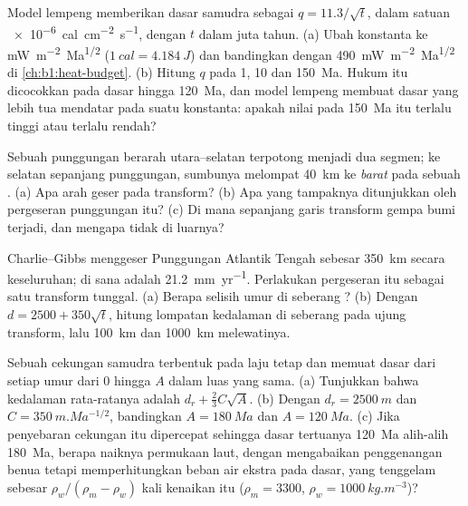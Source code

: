 \begin{exercise}[$\star\star$]\label{exo:b1:rifts-ridges-margins:7}
Model lempeng memberikan  dasar samudra sebagai $q = 11.3/\sqrt t$, dalam satuan \qty{e-6}{cal.cm^{-2}.s^{-1}}, dengan $t$ dalam juta tahun. (a) Ubah konstanta ke \unit{mW.m^{-2}.Ma^{1/2}} ($\qty{1}{cal} =
\qty{4.184}{J}$) dan bandingkan dengan \qty{490}{mW.m^{-2}.Ma^{1/2}} di \cref{ch:b1:heat-budget}. (b) Hitung $q$ pada 1, 10 dan \qty{150}{Ma}. Hukum itu dicocokkan pada dasar hingga \qty{120}{Ma}, dan model lempeng membuat  dasar yang lebih tua mendatar pada suatu konstanta: apakah nilai pada \qty{150}{Ma} itu terlalu tinggi atau terlalu rendah?
\end{exercise}

\begin{exercise}[$\star\star$]\label{exo:b1:rifts-ridges-margins:8}
Sebuah punggungan berarah utara--selatan terpotong menjadi dua segmen; ke selatan sepanjang punggungan, sumbunya melompat \qty{40}{km} ke \emph{barat} pada sebuah . (a) Apa arah geser pada transform? (b) Apa yang tampaknya ditunjukkan oleh pergeseran punggungan itu? (c) Di mana sepanjang garis transform gempa bumi terjadi, dan mengapa tidak di luarnya?
\end{exercise}

\begin{exercise}[$\star\star$]\label{exo:b1:rifts-ridges-margins:9}
 Charlie--Gibbs menggeser Punggungan Atlantik Tengah sebesar \qty{350}{km} secara keseluruhan;  di sana adalah \qty{21.2}{mm.yr^{-1}}. Perlakukan pergeseran itu sebagai satu transform tunggal. (a) Berapa selisih umur di seberang ? (b) Dengan $d = 2500 + 350\sqrt t$, hitung lompatan kedalaman di seberang  pada ujung transform, lalu \qty{100}{km} dan \qty{1000}{km} melewatinya.
\end{exercise}

\begin{exercise}[$\star\star\star$]\label{exo:b1:rifts-ridges-margins:10}
Sebuah cekungan samudra terbentuk pada laju tetap dan memuat dasar dari setiap umur dari 0 hingga $A$ dalam luas yang sama. (a) Tunjukkan bahwa kedalaman rata-ratanya adalah $d_r +
\frac23C\sqrt A$. (b) Dengan $d_r = \qty{2500}{m}$ dan
$C = \qty{350}{m.Ma^{-1/2}}$, bandingkan $A = \qty{180}{Ma}$ dan
$A = \qty{120}{Ma}$. (c) Jika penyebaran cekungan itu dipercepat sehingga dasar tertuanya \qty{120}{Ma} alih-alih \qty{180}{Ma}, berapa naiknya permukaan laut, dengan mengabaikan penggenangan benua tetapi memperhitungkan beban air ekstra pada dasar, yang tenggelam sebesar $\rho_w/(\rho_m - \rho_w)$ kali kenaikan itu ($\rho_m = 3300$, $\rho_w = \qty{1000}{kg.m^{-3}}$)?
\end{exercise}

